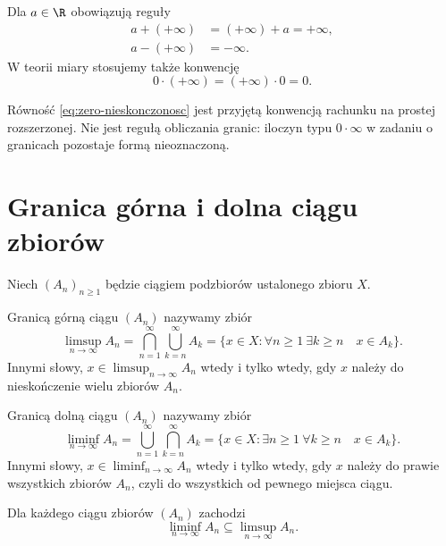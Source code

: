 Dla $a\in\R$ obowiązują reguły
\begin{align*}
  a+(+\infty)&=(+\infty)+a=+\infty,\\
  a-(+\infty)&=-\infty.
\end{align*}
W teorii miary stosujemy także konwencję
\begin{equation}
  0\cdot(+\infty)=(+\infty)\cdot0=0.
  \label{eq:zero-nieskonczonosc}
\end{equation}

\begin{uwaga}
Równość \eqref{eq:zero-nieskonczonosc} jest przyjętą konwencją rachunku
na prostej rozszerzonej. Nie jest regułą obliczania granic: iloczyn typu
$0\cdot\infty$ w zadaniu o granicach pozostaje formą nieoznaczoną.
\end{uwaga}

\section{Granica górna i dolna ciągu zbiorów}
\label{sec:granice-zbiorow}

Niech $(A_n)_{n\geq1}$ będzie ciągiem podzbiorów ustalonego zbioru $X$.

\begin{definicja}
Granicą górną ciągu $(A_n)$ nazywamy zbiór
\begin{equation}
  \limsup_{n\to\infty}A_n
  =\bigcap_{n=1}^{\infty}\bigcup_{k=n}^{\infty}A_k
  =\{x\in X:\forall n\geq1\ \exists k\geq n\quad x\in A_k\}.
  \label{eq:limsup}
\end{equation}
Innymi słowy, $x\in\limsup_{n\to\infty}A_n$ wtedy i tylko wtedy, gdy $x$
należy do nieskończenie wielu zbiorów $A_n$.
\end{definicja}

\begin{definicja}
Granicą dolną ciągu $(A_n)$ nazywamy zbiór
\begin{equation}
  \liminf_{n\to\infty}A_n
  =\bigcup_{n=1}^{\infty}\bigcap_{k=n}^{\infty}A_k
  =\{x\in X:\exists n\geq1\ \forall k\geq n\quad x\in A_k\}.
  \label{eq:liminf}
\end{equation}
Innymi słowy, $x\in\liminf_{n\to\infty}A_n$ wtedy i tylko wtedy, gdy $x$
należy do prawie wszystkich zbiorów $A_n$, czyli do wszystkich od pewnego
miejsca ciągu.
\end{definicja}

\begin{fakt}
Dla każdego ciągu zbiorów $(A_n)$ zachodzi
\begin{equation}
  \liminf_{n\to\infty}A_n\subseteq\limsup_{n\to\infty}A_n.
  \label{eq:inkluzja-granic}
\end{equation}
\end{fakt}


